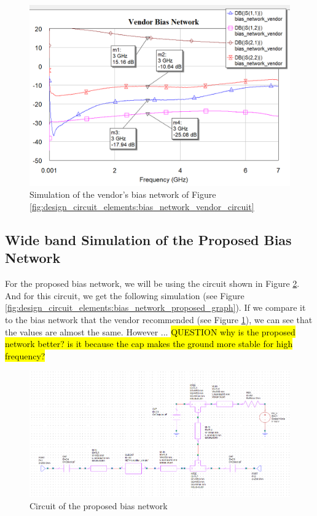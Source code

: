 \documentclass[12pt]{report} %
\newcommand{\question}[1]{\sethlcolor{red}\hl{QUESTION #1}}
\begin{document}
\begin{figure}[htbp]
    \centering
    \includegraphics[width=1\linewidth]{images//design_circuit_elements/bias_network_vendor_graph.png}
    \caption{Simulation of the vendor's bias network of Figure \ref{fig:design_circuit_elements:bias_network_vendor_circuit}}
    \label{fig:design_circuit_elements:bias_network_vendor_graph}
\end{figure}

\subsection{Wide band Simulation of the Proposed Bias Network}

For the proposed bias network, we will be using the circuit shown in Figure \ref{fig:design_circuit_elements:bias_network_proposed_circuit}. And for this circuit, we get the following simulation (see Figure \ref{fig:design_circuit_elements:bias_network_proposed_graph}). If we compare it to the bias network that the vendor recommended (see Figure \ref{fig:design_circuit_elements:bias_network_vendor_graph}), we can see that the values are almost the same. However ... \question{why is the proposed network better? is it because the cap makes the ground more stable for high frequency?}

\begin{figure}[htbp]
    \centering
    \includegraphics[width=1\linewidth]{images//design_circuit_elements/bias_network_proposed_circuit.png}
    \caption{Circuit of the proposed bias network}
    \label{fig:design_circuit_elements:bias_network_proposed_circuit}
\end{figure}
\end{document}
